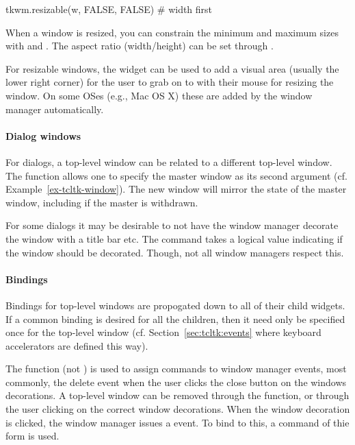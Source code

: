 \begin{Schunk}
  \begin{Sinput}
tkwm.resizable(w, FALSE, FALSE)    # width first
  \end{Sinput}
\end{Schunk}
%
When a window is resized, you can constrain the minimum and maximum
sizes with  and . The
aspect ratio (width/height) can be set through .


For resizable windows, the  widget can be
used to add a visual area (usually the lower right corner) for the
user to grab on to with their mouse for resizing the window. On some
OSes (e.g., Mac OS X) these are added by the window manager
automatically.


\paragraph{Dialog windows}
For dialogs, a top-level window can be related to
a different top-level window. The function 
allows one to specify the master window as its second
argument (cf. Example~\ref{ex-tcltk-window}). The
new window will mirror the state of the master window, including if
the master is withdrawn.

For some dialogs it may be desirable to not have the
window manager decorate the window with a title bar etc. The command
 takes a logical
value indicating if the window should be decorated. Though, not all
window managers respect this.



\paragraph{Bindings}
Bindings for top-level windows are propogated down to all of their
child widgets. If a common binding is desired for all the children,
then it need only be specified once for the top-level window
(cf. Section~\ref{sec:tcltk:events} where keyboard accelerators are
defined this way).


The  function (not ) is used
to assign commands to window manager events, most commonly, the delete
event when the user clicks the close button on the windows
decorations. A top-level window can be removed through the
 function, or through the user clicking on the
correct window decorations. When the window decoration is clicked, the
window manager issues a  event. To bind to
this, a command of thie form
 is used.


